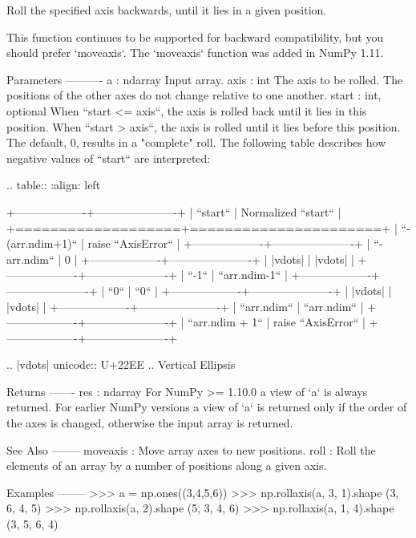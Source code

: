 \begin{DoxyVerb}Roll the specified axis backwards, until it lies in a given position.

This function continues to be supported for backward compatibility, but you
should prefer `moveaxis`. The `moveaxis` function was added in NumPy
1.11.

Parameters
----------
a : ndarray
    Input array.
axis : int
    The axis to be rolled. The positions of the other axes do not
    change relative to one another.
start : int, optional
    When ``start <= axis``, the axis is rolled back until it lies in
    this position. When ``start > axis``, the axis is rolled until it
    lies before this position. The default, 0, results in a "complete"
    roll. The following table describes how negative values of ``start``
    are interpreted:

    .. table::
       :align: left

       +-------------------+----------------------+
       |     ``start``     | Normalized ``start`` |
       +===================+======================+
       | ``-(arr.ndim+1)`` | raise ``AxisError``  |
       +-------------------+----------------------+
       | ``-arr.ndim``     | 0                    |
       +-------------------+----------------------+
       | |vdots|           | |vdots|              |
       +-------------------+----------------------+
       | ``-1``            | ``arr.ndim-1``       |
       +-------------------+----------------------+
       | ``0``             | ``0``                |
       +-------------------+----------------------+
       | |vdots|           | |vdots|              |
       +-------------------+----------------------+
       | ``arr.ndim``      | ``arr.ndim``         |
       +-------------------+----------------------+
       | ``arr.ndim + 1``  | raise ``AxisError``  |
       +-------------------+----------------------+
       
    .. |vdots|   unicode:: U+22EE .. Vertical Ellipsis

Returns
-------
res : ndarray
    For NumPy >= 1.10.0 a view of `a` is always returned. For earlier
    NumPy versions a view of `a` is returned only if the order of the
    axes is changed, otherwise the input array is returned.

See Also
--------
moveaxis : Move array axes to new positions.
roll : Roll the elements of an array by a number of positions along a
    given axis.

Examples
--------
>>> a = np.ones((3,4,5,6))
>>> np.rollaxis(a, 3, 1).shape
(3, 6, 4, 5)
>>> np.rollaxis(a, 2).shape
(5, 3, 4, 6)
>>> np.rollaxis(a, 1, 4).shape
(3, 5, 6, 4)\end{DoxyVerb}
 \mbox{\label{namespacenumpy_1_1core_1_1numeric_ad0f92680111292b4be69b722b3732991}} 
